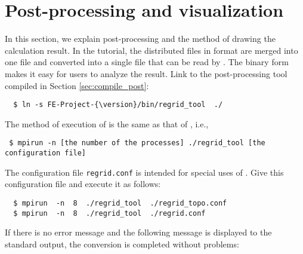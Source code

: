 \section{Post-processing and visualization} \label{sec:ideal_exp_regrid}
In this section, we explain post-processing and the method of drawing the calculation result.
In the tutorial, the distributed files in \netcdf format are merged into one file
and converted into a single \netcdf file that can be read by {\grads}.
The binary form makes it easy for users to analyze the result.
Link to the post-processing tool \regridTool compiled in Section \ref{sec:compile_post}:
\begin{verbatim}
  $ ln -s FE-Project-{\version}/bin/regrid_tool  ./
\end{verbatim}

The method of execution of \regridTool is the same as that of \scaledg, i.e.,
\begin{verbatim}
 $ mpirun -n [the number of the processes] ./regrid_tool [the configuration file]
\end{verbatim}
The configuration file \verb|regrid.conf| is intended for special uses of \regridTool.
Give this configuration file and execute it as follows:
\begin{verbatim}
  $ mpirun  -n  8  ./regrid_tool  ./regrid_topo.conf
  $ mpirun  -n  8  ./regrid_tool  ./regrid.conf
\end{verbatim}
If there is no error message and the following message is displayed to the standard output,
the conversion is completed without problems:



